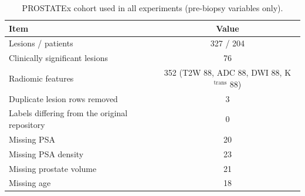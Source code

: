 \begin{table}[tbp]
\centering
\caption{PROSTATEx cohort used in all experiments (pre-biopsy variables only).}
\label{tab:s_cohort}
\small
\begin{tabular}{lc}
\toprule
Item & Value \\
\midrule
Lesions / patients & \num{327} / \num{204} \\
Clinically significant lesions & \num{76} \\
Radiomic features & \num{352} (T2W \num{88}, ADC \num{88}, DWI \num{88}, K$^{\mathrm{trans}}$ \num{88}) \\
Duplicate lesion rows removed & \num{3} \\
Labels differing from the original repository & \num{0} \\
Missing PSA & \num{20} \\
Missing PSA density & \num{23} \\
Missing prostate volume & \num{21} \\
Missing age & \num{18} \\
\bottomrule
\end{tabular}
\end{table}
